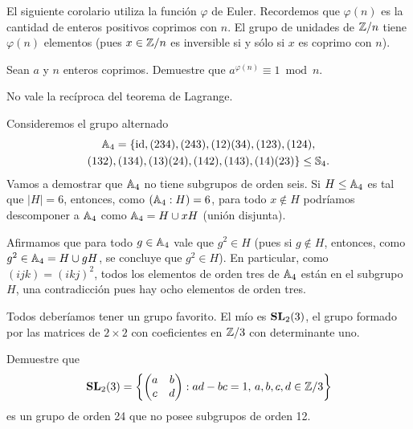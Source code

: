 El siguiente corolario utiliza la función $\varphi$ de Euler. Recordemos que
$\varphi(n)$ es la cantidad de enteros positivos coprimos con $n$. El grupo de
unidades de $\mathbb{Z}/n$ tiene $\varphi(n)$ elementos (pues $x\in\mathbb{Z}/n$ es inversible
si y sólo si $x$ es coprimo con $n$). 

\begin{exercise}
	Sean $a$ y $n$ enteros coprimos. Demuestre que 
	$a^{\varphi(n)}\equiv1\bmod n$.
\end{exercise}

No vale la recíproca del teorema de Lagrange.

\begin{example}
Consideremos el grupo alternado 
\begin{multline*}
\mathbb{A}_4=\{\operatorname{id},(234),(243),(12)(34),(123),(124),\\(132),(134),(13)(24),(142),(143),(14)(23)\}\leq\mathbb{S}_4.	
\end{multline*}
Vamos a demostrar que $\mathbb{A}_4$ no tiene subgrupos de orden seis. Si $H\leq\mathbb{A}_4$ es tal que 
$|H|=6$, entonces, como $(\mathbb{A}_4:H)=6$, para todo $x\not\in H$ podríamos descomponer a $\mathbb{A}_4$ como $\mathbb{A}_4=H\cup xH$ (unión disjunta). 

Afirmamos que
para todo $g\in\mathbb{A}_4$ vale que $g^2\in H$ (pues si $g\not\in H$, entonces, como $g^2\in\mathbb{A}_4=H\cup gH$, se concluye que $g^2\in H$). En particular, como
$(ijk)=(ikj)^2$, 
todos los elementos de orden tres de $\mathbb{A}_4$ están en el subgrupo $H$, una contradicción pues hay ocho elementos de orden tres.   
\end{example}

Todos deberíamos tener un grupo favorito. El mío es $\mathbf{SL}_2(3)$,
el grupo formado por las matrices de $2\times2$ con coeficientes en $\mathbb{Z}/3$ 
con determinante uno.

\begin{exercise}
Demuestre que 
\[
\mathbf{SL}_2(3)=\left\{\begin{pmatrix}a&b\\c&d\end{pmatrix}:ad-bc=1,\,a,b,c,d\in\mathbb{Z}/3\right\}
\]
es un grupo de orden 24 que no posee subgrupos de orden 12.	
\end{exercise}


%


%
%


